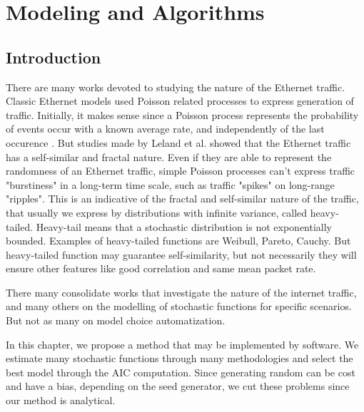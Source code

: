 \chapter{Modeling and Algorithms}\label{ch:modeling-evaluation}

\section{Introduction}

There are many works devoted to studying the nature of the Ethernet traffic\cite{selfsimilar-ethernet}. Classic Ethernet models used Poisson related processes to express generation of traffic. Initially, it makes sense since a Poisson process represents the probability of events occur with a known average rate, and independently of the last occurence\cite{selfsimilar-ethernet} \cite{book-poisson}. But studies made by Leland et al.\cite{selfsimilar-ethernet} showed that the Ethernet traffic has a self-similar and fractal nature. Even if they are able to represent the randomness of an Ethernet traffic, simple Poisson processes can't express traffic "burstiness" in a long-term time scale, such as traffic "spikes" on long-range "ripples". This is an indicative of the fractal and self-similar nature of the traffic, that usually we express by distributions with infinite variance, called heavy-tailed. Heavy-tail means that a stochastic distribution is not exponentially bounded\cite{sourcesonoff-paper}. Examples of heavy-tailed functions are Weibull, Pareto, Cauchy.  But heavy-tailed function may guarantee self-similarity, but not necessarily they will ensure other features like good correlation and same mean packet rate.

There many consolidate works that investigate the nature of the internet traffic\cite{selfsimilar-ethernet}\cite{analysis-self-similar}\cite{stochartic-selfsimilar}\cite{selfsimilar-highvariability}\cite{multi-player-online-game-self-similarity}, and many others on the modelling of stochastic functions for specific scenarios\cite{estimation-renewal-function-ethernet-traffic}\cite{modelling-of-self-similar}\cite{empirical-interarrival-study}\cite{modeling-concurrent-heavy-tailed}\cite{optimal-scheduling-of-heavy-tailed-traffic}\cite{modelling-of-self-similar}. But not as many on model choice automatization\cite{sourcesonoff-paper}.

In this chapter, we propose a method that may be implemented by  software. We estimate many stochastic functions through many methodologies and select the best model through the AIC computation\cite{bic-aic-comparision}. Since generating random can be cost and have a bias, depending on the seed generator, we cut these problems since our method is analytical. 

